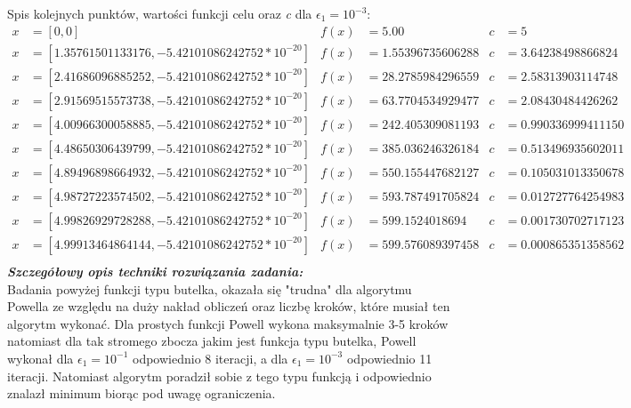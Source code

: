 \documentclass[a4paper,12pt]{article}
\begin{document}
Spis kolejnych punktów, wartości funkcji celu oraz \textit{c}  dla $\epsilon_{1} = 10^{-3}$:
\begin{align*}
x &= [0, 0] & 
f(x) &= 5.00 &
c &= 5 \\
x &= [1.35761501133176, -5.42101086242752 * 10^{-20}] & 
f(x) &= 1.55396735606288 &
c &= 3.64238498866824 \\
x &= [2.41686096885252, -5.42101086242752 * 10^{-20}] & 
f(x) &= 28.2785984296559 &
c &= 2.58313903114748 \\
x &= [2.91569515573738, -5.42101086242752 * 10^{-20}] & 
f(x) &= 63.7704534929477 &
c &= 2.08430484426262 \\
x &= [4.00966300058885, -5.42101086242752 * 10^{-20}] & 
f(x) &= 242.405309081193 &
c &= 0.990336999411150 \\
x &= [4.48650306439799, -5.42101086242752 * 10^{-20}] & 
f(x) &= 385.036246326184 &
c &= 0.513496935602011 \\
x &= [4.89496898664932, -5.42101086242752 * 10^{-20}] & 
f(x) &= 550.155447682127 &
c &= 0.105031013350678 \\
x &= [4.98727223574502, -5.42101086242752 * 10^{-20}] & 
f(x) &= 593.787491705824 &
c &= 0.012727764254983 \\
x &= [4.99826929728288,-5.42101086242752 * 10^{-20}] & 
f(x) &= 599.1524018694 &
c &= 0.001730702717123 \\
x &= [4.99913464864144,-5.42101086242752 * 10^{-20}] & 
f(x) &= 599.576089397458 &
c &= 0.000865351358562 \\
\end{align*}
\newline
\textbf{\textit{Szczegółowy opis techniki rozwiązania zadania:}} \\
Badania powyżej funkcji typu butelka, okazała się "trudna" dla algorytmu Powella ze względu na duży nakład obliczeń oraz liczbę kroków, które musiał ten algorytm wykonać. Dla prostych funkcji Powell wykona maksymalnie 3-5 kroków natomiast dla tak stromego zbocza jakim jest funkcja typu butelka, Powell wykonał dla $\epsilon_{1} = 10^{-1}$ odpowiednio 8 iteracji, a dla $\epsilon_{1} = 10^{-3}$ odpowiednio 11 iteracji. Natomiast algorytm poradził sobie z tego typu funkcją i odpowiednio znalazł minimum biorąc pod uwagę ograniczenia.
\end{document}
